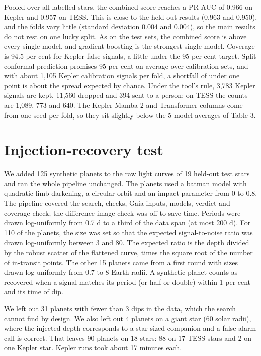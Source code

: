 \documentclass[fleqn,usenatbib]{mnras}
\begin{document}
Pooled over all labelled stars, the combined score reaches a PR-AUC of 0.966 on Kepler and 0.957 on TESS. This is close to the held-out results (0.963 and 0.950), and the folds vary little (standard deviation 0.004 and 0.004), so the main results do not rest on one lucky split. As on the test sets, the combined score is above every single model, and gradient boosting is the strongest single model. Coverage is 94.5 per cent for Kepler false signals, a little under the 95 per cent target. Split conformal prediction promises 95 per cent on average over calibration sets, and with about 1,105 Kepler calibration signals per fold, a shortfall of under one point is about the spread expected by chance. Under the tool's rule, 3,783 Kepler signals are kept, 11,560 dropped and 394 sent to a person; on TESS the counts are 1,089, 773 and 640. The Kepler Mamba-2 and Transformer columns come from one seed per fold, so they sit slightly below the 5-model averages of Table 3.

\section{Injection-recovery test}

We added 125 synthetic planets to the raw light curves of 19 held-out test stars and ran the whole pipeline unchanged. The planets used a batman model with quadratic limb darkening, a circular orbit and an impact parameter from 0 to 0.8. The pipeline covered the search, checks, Gaia inputs, models, verdict and coverage check; the difference-image check was off to save time. Periods were drawn log-uniformly from 0.7 d to a third of the data span (at most 200 d). For 110 of the planets, the size was set so that the expected signal-to-noise ratio was drawn log-uniformly between 3 and 80. The expected ratio is the depth divided by the robust scatter of the flattened curve, times the square root of the number of in-transit points. The other 15 planets came from a first round with sizes drawn log-uniformly from 0.7 to 8 Earth radii. A synthetic planet counts as recovered when a signal matches its period (or half or double) within 1 per cent and its time of dip.

We left out 31 planets with fewer than 3 dips in the data, which the search cannot find by design. We also left out 4 planets on a giant star (60 solar radii), where the injected depth corresponds to a star-sized companion and a false-alarm call is correct. That leaves 90 planets on 18 stars: 88 on 17 TESS stars and 2 on one Kepler star. Kepler runs took about 17 minutes each.
\end{document}
